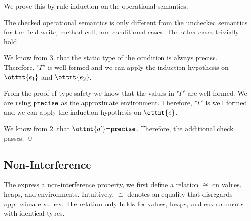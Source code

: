 We prove this by rule induction on the operational semantics.

The checked operational semantics is only different from the unchecked
semantics for the field write, method call, and conditional cases.
The other cases trivially hold.




We know from $3.$ that the static type of the condition is always
precise.
Therefore, $\mathit{ {^r}\!\Gamma}'$ is well formed and we can apply the induction
hypothesis on $\ottnt{e_{{\mathrm{1}}}}$ and $\ottnt{e_{{\mathrm{2}}}}$.



From the proof of type safety we know that the values in $\mathit{ {^r}\!\Gamma}'$ are
well formed. We are using $ \texttt{\upshape{precise}\,\!} $ as the approximate environment.
Therefore, $\mathit{ {^r}\!\Gamma}'$ is well formed and we can apply the induction
hypothesis on $\ottnt{e}$.



We know from $2.$ that $\ottnt{q'}  \textsf{=}   \texttt{\upshape{precise}\,\!} $.
Therefore, the additional check passes.
\qed


\subsection{Non-Interference}

The express a non-interference property, we first define a relation $\cong$ on
values, heaps, and environments. Intuitively, 
$\cong$ denotes an equality that disregards approximate
values. The relation only holds for values, heaps, and environments with
identical types.

